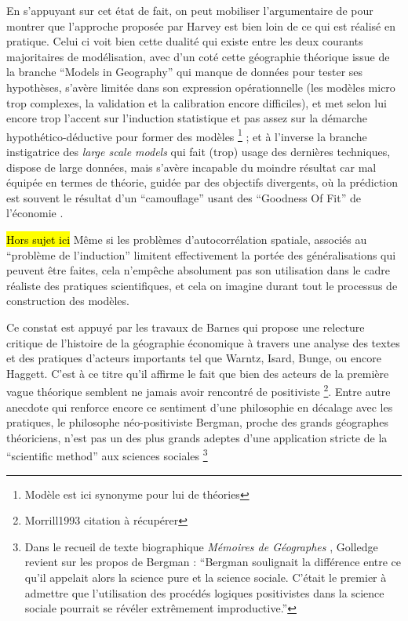 En s'appuyant sur cet état de fait, on peut mobiliser l'argumentaire de \textcite{Wilson1972} pour montrer que l'approche proposée par Harvey est bien loin de ce qui est réalisé en pratique. Celui ci voit bien cette dualité qui existe entre les deux courants majoritaires de modélisation, avec d'un coté cette géographie théorique issue de la branche \foreignquote{english}{Models in Geography} qui manque de données pour tester ses hypothèses, s'avère limitée dans son expression opérationnelle (les modèles micro trop complexes, la validation et la calibration encore difficiles), et met selon lui encore trop l'accent sur l'induction statistique et pas assez sur la démarche hypothético-déductive pour former des modèles \footnote{Modèle est ici synonyme pour lui de théories} ; et à l'inverse la branche instigatrice des \textit{large scale models} qui fait (trop) usage des dernières techniques, dispose de large données, mais s'avère incapable du moindre résultat car mal équipée en termes de théorie, guidée par des objectifs divergents, où la prédiction est souvent le résultat d'un \enquote{camouflage} usant des \foreignquote{english}{Goodness Of Fit} de l'économie \autocite[10]{Batty1994}.

\hl{Hors sujet ici }
Même si les problèmes d'autocorrélation spatiale, associés au \enquote{problème de l'induction} limitent effectivement la portée des généralisations qui peuvent être faites, cela n’empêche absolument pas son utilisation dans le cadre réaliste des pratiques scientifiques, et cela on imagine durant tout le processus de construction des modèles.


Ce constat est appuyé par les travaux de Barnes qui propose une relecture critique de l'histoire de la géographie économique \autocite[122]{Barnes1996} à travers une analyse des textes et des pratiques d'acteurs importants tel que Warntz, Isard, Bunge, ou encore Haggett. C'est à ce titre qu'il affirme \autocite{Barnes2001a} le fait que bien des acteurs de la première vague théorique semblent ne jamais avoir rencontré de positiviste \footnote{Morrill1993 citation à récupérer}. Entre autre anecdote qui renforce encore ce sentiment d'une philosophie en décalage avec les pratiques, le philosophe néo-positiviste Bergman, proche des grands géographes théoriciens, n'est pas un des plus grands adeptes d'une application stricte de la \foreignquote{english}{scientific method} aux sciences sociales \footnote{Dans le recueil de texte biographique \textit{Mémoires de Géographes} \textcite[96]{Bailly2000}, Golledge revient sur les propos de Bergman : \enquote{Bergman soulignait la différence entre ce qu'il appelait alors la science pure et la science sociale. C'était le premier à admettre que l'utilisation des procédés logiques positivistes dans la science sociale pourrait se révéler extrêmement improductive.} }

